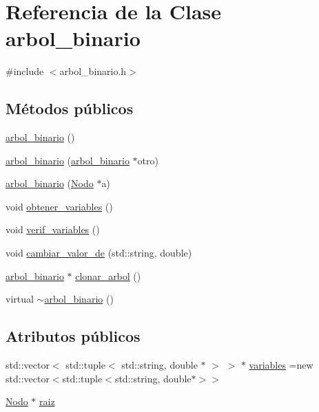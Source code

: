 \hypertarget{classarbol__binario}{}\section{Referencia de la Clase arbol\+\_\+binario}
\label{classarbol__binario}


{\ttfamily \#include $<$arbol\+\_\+binario.\+h$>$}

\subsection*{Métodos públicos}
\begin{DoxyCompactItemize}
\item 
\hyperlink{classarbol__binario_a3fd8045909407e2694f86220e2fe7721}{arbol\+\_\+binario} ()
\item 
\hyperlink{classarbol__binario_ac5da428c6dae932898a552737cd962ce}{arbol\+\_\+binario} (\hyperlink{classarbol__binario}{arbol\+\_\+binario} $\ast$otro)
\item 
\hyperlink{classarbol__binario_ad92ea65c1e977186deebb4b3d546563e}{arbol\+\_\+binario} (\hyperlink{class_nodo}{Nodo} $\ast$a)
\item 
void \hyperlink{classarbol__binario_a4f3ec4517b5c93b96910954daef70932}{obtener\+\_\+variables} ()
\item 
void \hyperlink{classarbol__binario_ad8b56c87e0a2a3c4ff73711b8687e52c}{verif\+\_\+variables} ()
\item 
void \hyperlink{classarbol__binario_a7677ef12f5b35a40071bbf08cd6a0c39}{cambiar\+\_\+valor\+\_\+de} (std\+::string, double)
\item 
\hyperlink{classarbol__binario}{arbol\+\_\+binario} $\ast$ \hyperlink{classarbol__binario_ad9ae6536030a20ddaf77f607f6c6c0f7}{clonar\+\_\+arbol} ()
\item 
virtual \hyperlink{classarbol__binario_aebe4b913af3537f4f497cd400e3fba46}{$\sim$arbol\+\_\+binario} ()
\end{DoxyCompactItemize}
\subsection*{Atributos públicos}
\begin{DoxyCompactItemize}
\item 
std\+::vector$<$ std\+::tuple$<$ std\+::string, double $\ast$ $>$ $>$ $\ast$ \hyperlink{classarbol__binario_abf62bbd11f1402afe144a15f7873f70c}{variables} =new std\+::vector$<$std\+::tuple$<$std\+::string, double$\ast$$>$$>$
\item 
\hyperlink{class_nodo}{Nodo} $\ast$ \hyperlink{classarbol__binario_a8b2e413c14eed98c67afd82b6c9e2074}{raiz}
\end{DoxyCompactItemize}



